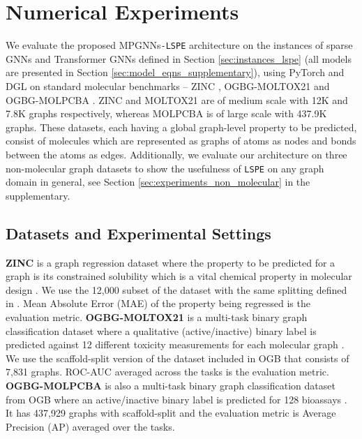\documentclass{article} \usepackage{iclr2021_conference,times}
\begin{document}
 


\section{Numerical Experiments}
\label{sec:numerical_experiments}
We evaluate the proposed MPGNNs\texttt{-LSPE} architecture on the instances of sparse GNNs and Transformer GNNs defined in Section \ref{sec:instances_lspe} (all models 
are
presented in Section \ref{sec:model_eqns_supplementary}), using PyTorch \citep{paszke2019pytorch} and DGL \citep{wang2019deep} on standard molecular benchmarks -- ZINC \citep{irwin2012zinc}, OGBG-MOLTOX21 and OGBG-MOLPCBA \citep{hu2020ogb}. 
ZINC and MOLTOX21 are of medium scale with 12K and 7.8K graphs respectively, whereas MOLPCBA is of large scale with 437.9K graphs.
These datasets, each having a global graph-level property to be predicted, consist of molecules which are represented as graphs of atoms as nodes and bonds between the atoms as edges.
Additionally, we evaluate our architecture on three non-molecular graph datasets to show the usefulness of \texttt{LSPE} on any graph domain in general, see Section \ref{sec:experiments_non_molecular} in the supplementary.

\subsection{Datasets and Experimental Settings}
\label{sec:experiments_datasets_and_settings}
\textbf{ZINC} is a graph regression dataset where the property to be predicted for a graph is its constrained solubility which is a vital chemical property in molecular design \citep{jin2018junction}. We use the 12,000 subset of the dataset with the same splitting defined in \cite{dwivedi2020benchmarking}. Mean Absolute Error (MAE) of the property being regressed is the evaluation metric. 
\textbf{OGBG-MOLTOX21} is a multi-task binary graph classification dataset where a qualitative (active/inactive) binary label is predicted against 12 different toxicity measurements for each molecular graph \citep{tox, wu2018moleculenet}. We use the scaffold-split version of the dataset included in OGB \citep{hu2020ogb} that consists of 7,831 graphs. ROC-AUC averaged across the tasks is the evaluation metric.
\textbf{OGBG-MOLPCBA} is also a multi-task binary graph classification dataset from OGB where an active/inactive binary label is predicted for 128 bioassays \citep{wang2012pubchem, wu2018moleculenet}. It has 437,929 graphs with scaffold-split and the evaluation metric is Average Precision (AP) averaged over the tasks.
\end{document}
